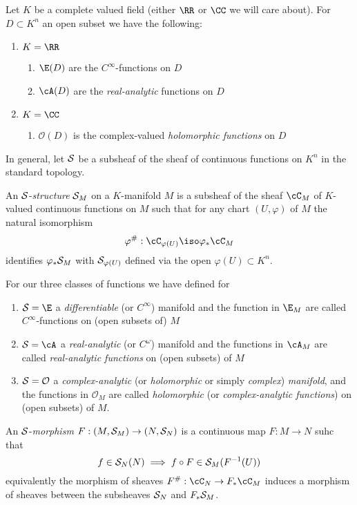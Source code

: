 \documentclass[12pt]{article}
\newcommand{\cO}{\mathcal{O}}
\theoremstyle{plain}
\begin{document}
Let $K$ be a complete valued field (either $\RR$ or $\CC$ we will care about). For $D \subset K^n$ an open subset we have the following:
\begin{enumerate}
\item $K = \RR$
\begin{enumerate}
\item $\E(D)$ are the $C^\infty$-functions on $D$
\item $\cA(D)$ are the \textit{real-analytic} functions on $D$
\end{enumerate}
\item $K = \CC$
\begin{enumerate}
\item $\cO(D)$ is the complex-valued \textit{holomorphic functions} on $D$
\end{enumerate}
\end{enumerate}
In general, let $\mathcal{S}$ be a subsheaf of the sheaf of continuous functions on $K^n$ in the standard topology.

\begin{defn} [1, Definition 1.1]
An $\mathcal{S}$-\textit{structure} $\mathcal{S}_M$ on a $K$-manifold $M$ is a subsheaf of the sheaf $\cC_M$ of $K$-valued continuous functions on $M$ such that for any chart $(U, \varphi)$ of $M$ the natural isomorphism
\[ \varphi^{\#} : \cC_{\varphi(U)} \iso \varphi_* \cC_M \]
identifies $\varphi_* \mathcal{S}_M$ with $\mathcal{S}_{\varphi(U)}$ defined via the open $\varphi(U) \subset K^n$.  
\end{defn}

For our three classes of functions we have defined for
\begin{enumerate}
\item $\cS = \E$ a \textit{differentiable} (or $C^\infty$) manifold and the function in $\E_M$ are called $C^{\infty}$-functions on (open subsets of) $M$
\item $\cS = \cA$ a \textit{real-analytic} (or $C^\omega$) manifold and the functions in $\cA_M$ are called \textit{real-analytic functions} on (open subsets) of $M$
\item $\cS = \cO$ a \textit{complex-analytic} (or \textit{holomorphic} or simply \textit{complex}) \textit{manifold}, and the functions in $\cO_M$ are called \textit{holomorphic} (or \textit{complex-analytic functions}) on (open subsets) of $M$.
\end{enumerate}

\begin{defn}
An $\mathcal{S}$-\textit{morphism} $F : (M, \mathcal{S}_M) \to (N, \mathcal{S}_N)$ is a continuous map $F : M \to N$ suhc that
\[ f \in \mathcal{S}_N(N) \implies f \circ F \in \mathcal{S}_M(F^{-1}(U)) \]
equivalently the morphism of sheaves $F^{\#} : \cC_N \to F_* \cC_M$ induces a morphism of sheaves between the subsheaves $\mathcal{S}_N$ and $F_* \mathcal{S}_M$.
\end{defn}
\end{document}

